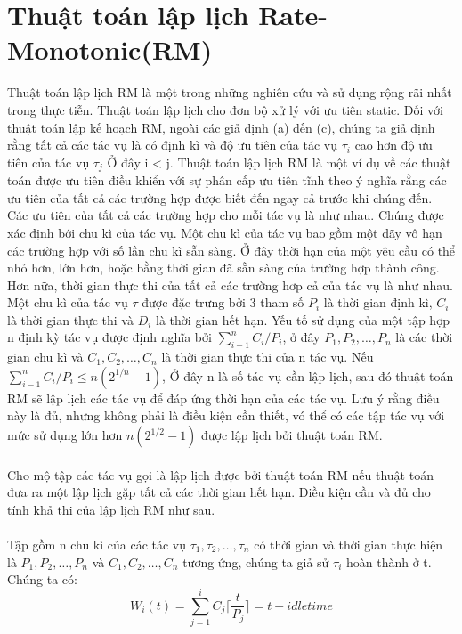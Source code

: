 \documentclass[a4paper,10pt]{report}
\begin{document}
\section{Thuật toán lập lịch Rate-Monotonic(RM)}
Thuật toán lập lịch RM là một trong những nghiên cứu và sử dụng rộng rãi nhất trong thực tiễn. Thuật toán lập lịch cho đơn bộ xử lý với ưu tiên static. Đối với thuật toán lập kế hoạch RM, ngoài các giả định (a) đến (c), chúng ta giả định rằng tất cả các tác vụ là có định kì và độ ưu tiên của tác vụ $\tau_i$ cao hơn độ ưu tiên của tác vụ $\tau_j$ Ở đây i < j. Thuật toán lập lịch RM là một ví dụ về các thuật toán được ưu tiên điều khiển với sự phân cấp ưu tiên tĩnh theo ý nghĩa rằng các ưu tiên của tất cả các trường hợp được biết đến ngay cả trước khi chúng đến. Các ưu tiên của tất cả các trường hợp cho mỗi tác vụ là như nhau. Chúng được xác định bới chu kì của tác vụ. Một chu kì của tác vụ bao gồm một dãy vô hạn các trường hợp với số lần chu kì sẵn sàng. Ở đây thời hạn của một yêu cầu có thể nhỏ hơn, lớn hơn, hoặc bằng thời gian đã sẵn sàng của trường hợp thành công. Hơn nữa, thời gian thực thi của tất cả các trường hơp cả của tác vụ là như nhau. Một chu kì của tác vụ $\tau$ được đặc trưng bởi 3 tham số $P_i$ là thời gian định kì, $C_i$ là thời gian thực thi và $D_i$ là thời gian hết hạn. Yếu tố sử dụng của một tập hợp n định kỳ tác vụ được định nghĩa bởi $\sum_{i-1}^{n}C_i/P_i$, ở đây $P_1, P_2, \ldots, P_n$ là các thời gian chu kì và $C_1, C_2, \ldots, C_n$ là thời gian thực thi của n tác vụ. Nếu $\sum_{i-1}^{n}C_i/P_i \leq n(2^{1/n} - 1)$, Ở đây n là số tác vụ cần lập lịch, sau đó thuật toán RM sẽ lập lịch các tác vụ để đáp ứng thời hạn của các tác vụ. Lưu ý rằng điều này là đủ, nhưng không phải là điều kiện cần thiết, vó thể có các tập tác vụ với mức sử dụng lớn hơn $n(2^{1/2} - 1)$ được lập lịch bởi thuật toán RM.  \\ \\
Cho mộ tập các tác vụ gọi là lập lịch được bởi thuật toán RM nếu thuật toán đưa ra một lập lịch gặp tất cả các thời gian hết hạn. Điều kiện cần và đủ cho tính khả thi của lập lịch RM như sau. \\ \\
Tập gồm n chu kì của các tác vụ $\tau_1, \tau_2, \ldots, \tau_n$ có thời gian và thời gian thực hiện là $P_1, P_2, \ldots, P_n$ và $C_1, C_2, \ldots, C_n$ tương ứng, chúng ta giả sử $\tau_i$ hoàn thành ở t. Chúng ta có:
\begin{displaymath}
W_i(t) = \sum_{j=1}^iC_j\lceil \frac{t}{P_j} \rceil = t - idle time
\end{displaymath}
\end{document}

